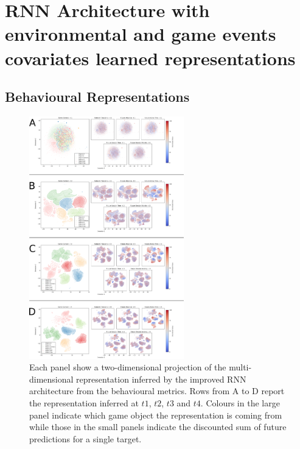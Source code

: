 \section{RNN Architecture with environmental and game events covariates learned representations}
\label{rnn_env_even_architecture_representations}

\subsection{Behavioural Representations}
\begin{figure}[!htb]
\includegraphics[width=0.6\textwidth]{images/appendix_D/rnn_full_beha_umap.png}
\centering
\caption[\textbf{Lower dimensional representation of the latent representations generated by the improved RNN architecture from the behavioural metrics}]{Each panel show a two-dimensional projection of the multi-dimensional representation inferred by the improved RNN architecture from the behavioural metrics. Rows from A to D report the representation inferred at $t1$, $t2$, $t3$ and $t4$. Colours in the large panel indicate which game object the representation is coming from while those in the small panels indicate the discounted sum of future predictions for a single target.}
\end{figure}
\FloatBarrier

